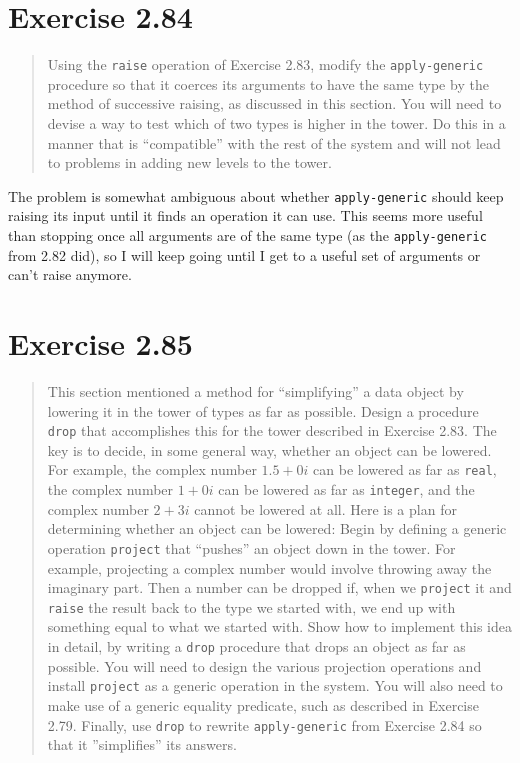 \documentclass{article}
\begin{document}


\section{Exercise 2.84}
\begin{quote}
    Using the \texttt{raise} operation of Exercise 2.83, modify the
    \texttt{apply-generic} procedure so that it coerces its arguments to have
    the same type by the method of successive raising, as discussed in this
    section. You will need to devise a way to test which of two types is higher
    in the tower. Do this in a manner that is ``compatible'' with the rest of
    the system and will not lead to problems in adding new levels to the tower.
\end{quote}

The problem is somewhat ambiguous about whether \texttt{apply-generic} should
keep raising its input until it finds an operation it can use. This seems more
useful than stopping once all arguments are of the same type (as the
\texttt{apply-generic} from 2.82 did), so I will keep going until I get to a
useful set of arguments or can't raise anymore.



\section{Exercise 2.85}
\begin{quote}
    This section mentioned a method for ``simplifying'' a data object by
    lowering it in the tower of types as far as possible. Design a procedure
    \texttt{drop} that accomplishes this for the tower described in Exercise
    2.83. The key is to decide, in some general way, whether an object can be
    lowered. For example, the complex number $1.5 + 0i$ can be lowered as far
    as \texttt{real}, the complex number $1 + 0i$ can be lowered as far as
    \texttt{integer}, and the complex number $2 + 3i$ cannot be lowered at all.
    Here is a plan for determining whether an object can be lowered: Begin by
    defining a generic operation \texttt{project} that ``pushes'' an object
    down in the tower. For example, projecting a complex number would involve
    throwing away the imaginary part. Then a number can be dropped if, when we
    \texttt{project} it and \texttt{raise} the result back to the type we
    started with, we end up with something equal to what we started with. Show
    how to implement this idea in detail, by writing a \texttt{drop} procedure
    that drops an object as far as possible. You will need to design the
    various projection operations and install \texttt{project} as a generic
    operation in the system. You will also need to make use of a generic
    equality predicate, such as described in Exercise 2.79. Finally, use
    \texttt{drop} to rewrite \texttt{apply-generic} from Exercise 2.84 so that
    it ''simplifies'' its answers.
\end{quote}
\end{document}
